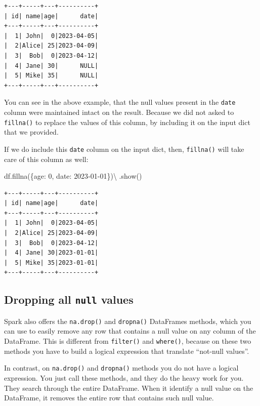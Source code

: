 \documentclass[
  11pt,
  letterpaper,
  DIV=11,
  numbers=noendperiod]{scrreprt}
\newenvironment{Shaded}{\begin{snugshade}}{\end{snugshade}}
\newcommand{\DecValTok}[1]{\textcolor[rgb]{0.68,0.00,0.00}{#1}}
\newcommand{\NormalTok}[1]{\textcolor[rgb]{0.00,0.23,0.31}{#1}}
\newcommand{\OperatorTok}[1]{\textcolor[rgb]{0.37,0.37,0.37}{#1}}
\newcommand{\StringTok}[1]{\textcolor[rgb]{0.13,0.47,0.30}{#1}}
\begin{document}
\begin{verbatim}
+---+-----+---+----------+
| id| name|age|      date|
+---+-----+---+----------+
|  1| John|  0|2023-04-05|
|  2|Alice| 25|2023-04-09|
|  3|  Bob|  0|2023-04-12|
|  4| Jane| 30|      NULL|
|  5| Mike| 35|      NULL|
+---+-----+---+----------+
\end{verbatim}

You can see in the above example, that the null values present in the
\texttt{date} column were maintained intact on the result. Because we
did not asked to \texttt{fillna()} to replace the values of this column,
by including it on the input dict that we provided.

If we do include this \texttt{date} column on the input dict, then,
\texttt{fillna()} will take care of this column as well:

\begin{Shaded}
\begin{Highlighting}[]
\NormalTok{df.fillna(\{}\StringTok{\textquotesingle{}age\textquotesingle{}}\NormalTok{: }\DecValTok{0}\NormalTok{, }\StringTok{\textquotesingle{}date\textquotesingle{}}\NormalTok{: }\StringTok{\textquotesingle{}2023{-}01{-}01\textquotesingle{}}\NormalTok{\})}\OperatorTok{\textbackslash{}}
\NormalTok{    .show()}
\end{Highlighting}
\end{Shaded}

\begin{verbatim}
+---+-----+---+----------+
| id| name|age|      date|
+---+-----+---+----------+
|  1| John|  0|2023-04-05|
|  2|Alice| 25|2023-04-09|
|  3|  Bob|  0|2023-04-12|
|  4| Jane| 30|2023-01-01|
|  5| Mike| 35|2023-01-01|
+---+-----+---+----------+
\end{verbatim}

\subsection{\texorpdfstring{Dropping all \texttt{null}
values}{Dropping all null values}}\label{dropping-all-null-values}

Spark also offers the \texttt{na.drop()} and \texttt{dropna()}
DataFrames methods, which you can use to easily remove any row that
contains a null value on any column of the DataFrame. This is different
from \texttt{filter()} and \texttt{where()}, because on these two
methods you have to build a logical expression that translate ``not-null
values''.

In contrast, on \texttt{na.drop()} and \texttt{dropna()} methods you do
not have a logical expression. You just call these methods, and they do
the heavy work for you. They search through the entire DataFrame. When
it identify a null value on the DataFrame, it removes the entire row
that contains such null value.
\end{document}
